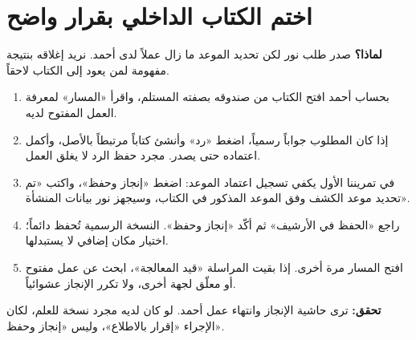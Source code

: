 \section{اختم الكتاب الداخلي بقرار واضح}
\label{sec:complete}
\textbf{لماذا؟} صدر طلب نور لكن تحديد الموعد ما زال عملاً لدى أحمد. نريد إغلاقه بنتيجة مفهومة لمن يعود إلى الكتاب لاحقاً.
\begin{enumerate}
\item بحساب أحمد افتح الكتاب من صندوقه بصفته المستلم، واقرأ «المسار» لمعرفة العمل المفتوح لديه.
\item إذا كان المطلوب جواباً رسمياً، اضغط «رد» وأنشئ كتاباً مرتبطاً بالأصل، وأكمل اعتماده حتى يصدر. مجرد حفظ الرد لا يغلق العمل.
\item في تمريننا الأول يكفي تسجيل اعتماد الموعد: اضغط «إنجاز وحفظ»، واكتب «تم تحديد موعد الكشف وفق الموعد المذكور في الكتاب، وسيجهز نور بيانات المنشأة».
\item راجع «الحفظ في الأرشيف» ثم أكّد «إنجاز وحفظ». النسخة الرسمية تُحفظ دائماً؛ اختيار مكان إضافي لا يستبدلها.
\item افتح المسار مرة أخرى. إذا بقيت المراسلة «قيد المعالجة»، ابحث عن عمل مفتوح أو معلّق لجهة أخرى، ولا تكرر الإنجاز عشوائياً.
\end{enumerate}
\textbf{تحقق:} ترى حاشية الإنجاز وانتهاء عمل أحمد. لو كان لديه مجرد نسخة للعلم، لكان الإجراء «إقرار بالاطلاع»، وليس «إنجاز وحفظ».

